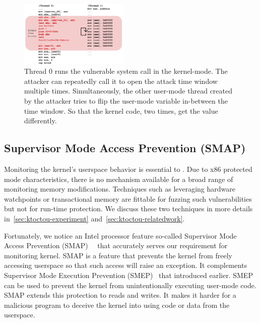 \begin{figure}[ht]
  \includegraphics[width=0.47\textwidth]{figures/toctouasm3}
  \centering
  \caption{Thread 0 runs the vulnerable system call in the kernel-mode. The attacker can repeatedly call it to open the attack time window multiple times. Simultaneously, the other user-mode thread created by the attacker tries to flip the user-mode variable in-between the time window. So that the kernel code, two times, get the value differently.}
  \label{fig:toctouasm}
\end{figure}



\subsection{Supervisor Mode Access Prevention (SMAP)}

Monitoring the kernel's userspace behavior is essential to \name. Due to x86 protected mode characteristics, there is no mechanism available for a broad range of monitoring memory modifications. Techniques such as leveraging hardware watchpoints or transactional memory are fittable for fuzzing such vulnerabilities but not for run-time protection. We discuss these two techniques in more details in~\autoref{sec:ktoctou-experiment} and~\autoref{sec:ktoctou-relatedwork}.

Fortunately, we notice an Intel processor feature so-called Supervisor Mode Access Prevention (SMAP)~\cite{corbet2012supervisorsmap}~\cite{mulnix2016intel} that accurately serves our requirement for monitoring kernel.
SMAP is a feature that prevents the kernel from freely accessing userspace so that such access will raise an exception. It complements Supervisor Mode Execution Prevention (SMEP)~\cite{fischer2011supervisor} that introduced earlier. SMEP can be used to prevent the kernel from unintentionally executing user-mode code. SMAP extends this protection to reads and writes. It makes it harder for a malicious program to deceive the kernel into using code or data from the userspace.

